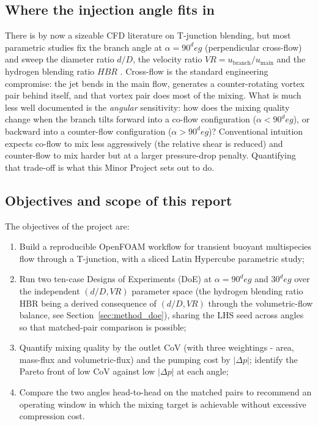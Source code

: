 \documentclass[11pt,a4paper]{article}
\def\dD{d/D}%
\def\VR{VR}%
\def\HBR{HBR}%
\def\CoV{CoV}%
\def\circ{ deg}%
\newcommand{\dD}{\ensuremath{d/D}}
\newcommand{\VR}{\ensuremath{\mathrm{VR}}}
\newcommand{\HBR}{\ensuremath{\mathrm{HBR}}}
\newcommand{\CoV}{\ensuremath{\mathrm{CoV}}}
\begin{document}
\subsection{Where the injection angle fits in}
There is by now a sizeable CFD literature on T-junction blending,
but most parametric studies fix the branch angle at
\(\alpha=90^\circ\) (perpendicular cross-flow) and sweep the
diameter ratio \(\dD\), the velocity ratio
\(\VR=u_{\mathrm{branch}}/u_{\mathrm{main}}\) and the hydrogen
blending ratio \(\HBR\)
\citep{su2022prediction,du2024numerical,montanes2024comprehensive}.
Cross-flow is the standard engineering compromise: the jet bends in
the main flow, generates a counter-rotating vortex pair behind
itself, and that vortex pair does most of the mixing. What is
much less well documented is the \emph{angular} sensitivity:
how does the mixing quality change when the branch tilts
forward into a co-flow configuration (\(\alpha < 90^\circ\)), or
backward into a counter-flow configuration
(\(\alpha > 90^\circ\))? Conventional intuition expects co-flow to
mix less aggressively (the relative shear is reduced) and
counter-flow to mix harder but at a larger pressure-drop penalty.
Quantifying that trade-off is what this Minor Project sets out
to do.

\subsection{Objectives and scope of this report}
\label{sec:intro_obj}
The objectives of the project are:
\begin{enumerate}
    \item Build a reproducible OpenFOAM workflow for transient
    buoyant multispecies flow through a T-junction, with a sliced
    Latin Hypercube parametric study;
    \item Run two ten-case Designs of Experiments (DoE) at
    \(\alpha = 90^\circ\) and \(30^\circ\) over the independent
    \((\dD,\VR)\) parameter space (the hydrogen blending ratio
    \HBR{} being a derived consequence of \((\dD,\VR)\) through
    the volumetric-flow balance, see
    Section~\ref{sec:method_doe}), sharing the LHS seed across
    angles so that matched-pair comparison is possible;
    \item Quantify mixing quality by the outlet \CoV{} (with three
    weightings - area, mass-flux and volumetric-flux) and the
    pumping cost by \(|\Delta p|\); identify the Pareto front of
    low \CoV{} against low \(|\Delta p|\) at each angle;
    \item Compare the two angles head-to-head on the matched pairs
    to recommend an operating window in which the mixing target is
    achievable without excessive compression cost.
\end{enumerate}
\end{document}
